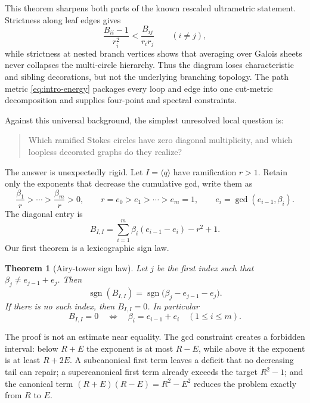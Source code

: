 \documentclass[11pt,a4paper]{amsart}
\theoremstyle{plain}
\newtheorem{theorem}{Theorem}[section]
\theoremstyle{definition}
\begin{document}
This theorem sharpens both parts of the known rescaled ultrametric statement.  Strictness along
leaf edges gives
\begin{equation}\label{eq:intro-strict-local}
 \frac{B_{ii}-1}{r_i^2}<\frac{B_{ij}}{r_ir_j}\qquad(i\ne j),
\end{equation}
while strictness at nested branch vertices shows that averaging over Galois sheets never collapses
the multi-circle hierarchy.  Thus the diagram loses characteristic and sibling decorations, but
not the underlying branching topology.  The path metric \eqref{eq:intro-energy} packages every
loop and edge into one cut-metric decomposition and supplies four-point and spectral constraints.

Against this universal background, the simplest unresolved local question is:
\begin{quote}
Which ramified Stokes circles have zero diagonal multiplicity, and which loopless decorated graphs
do they realize?
\end{quote}

The answer is unexpectedly rigid.  Let $I=\langle q\rangle$ have ramification $r>1$.  Retain only
the exponents that decrease the cumulative gcd, write them as
\[
  \frac{\beta_1}{r}>\cdots>\frac{\beta_m}{r}>0,
  \qquad r=e_0>e_1>\cdots>e_m=1,
  \qquad e_i=\gcd(e_{i-1},\beta_i).
\]
The diagonal entry is
\begin{equation}\label{eq:intro-loop}
  B_{I,I}=\sum_{i=1}^m\beta_i(e_{i-1}-e_i)-r^2+1.
\end{equation}
Our first theorem is a lexicographic sign law.

\begin{theorem}[Airy-tower sign law]\label{thm:intro-sign}
Let $j$ be the first index such that $\beta_j\ne e_{j-1}+e_j$.  Then
\[
 \operatorname{sgn}(B_{I,I})=
 \operatorname{sgn}\bigl(\beta_j-e_{j-1}-e_j\bigr).
\]
If there is no such index, then $B_{I,I}=0$.  In particular
\begin{equation}\label{eq:intro-zero}
 B_{I,I}=0\quad\Longleftrightarrow\quad
 \beta_i=e_{i-1}+e_i\quad(1\le i\le m).
\end{equation}
\end{theorem}

The proof is not an estimate near equality.  The gcd constraint creates a forbidden interval:
below $R+E$ the exponent is at most $R-E$, while above it the exponent is at least $R+2E$.
A subcanonical first term leaves a deficit that no decreasing tail can repair; a supercanonical
first term already exceeds the target $R^2-1$; and the canonical term
$(R+E)(R-E)=R^2-E^2$ reduces the problem exactly from $R$ to $E$.
\end{document}
